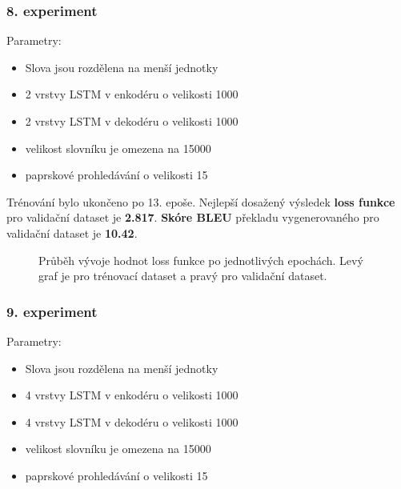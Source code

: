 \subsubsection{8. experiment}\label{experiment8}
Parametry:
\begin{itemize}
  \item Slova jsou rozdělena na menší jednotky
  \item 2 vrstvy LSTM v enkodéru o velikosti 1000
  \item 2 vrstvy LSTM v dekodéru o velikosti 1000
  \item velikost slovníku je omezena na 15000
  \item paprskové prohledávání o velikosti 15
\end{itemize}

Trénování bylo ukončeno po 13. epoše. Nejlepší dosažený výsledek \textbf{loss funkce} pro validační dataset je \textbf{2.817}. \textbf{Skóre BLEU} překladu vygenerovaného pro validační dataset je \textbf{10.42}.

\begin{figure}[H]
    \begin{center}
    \end{center}
	\caption{Průběh vývoje hodnot loss funkce po jednotlivých epochách. Levý graf je pro trénovací dataset a pravý pro validační dataset.}
\end{figure}

\subsubsection{9. experiment}\label{experiment9}
Parametry:
\begin{itemize}
  \item Slova jsou rozdělena na menší jednotky
  \item 4 vrstvy LSTM v enkodéru o velikosti 1000
  \item 4 vrstvy LSTM v dekodéru o velikosti 1000
  \item velikost slovníku je omezena na 15000
  \item paprskové prohledávání o velikosti 15
\end{itemize}

